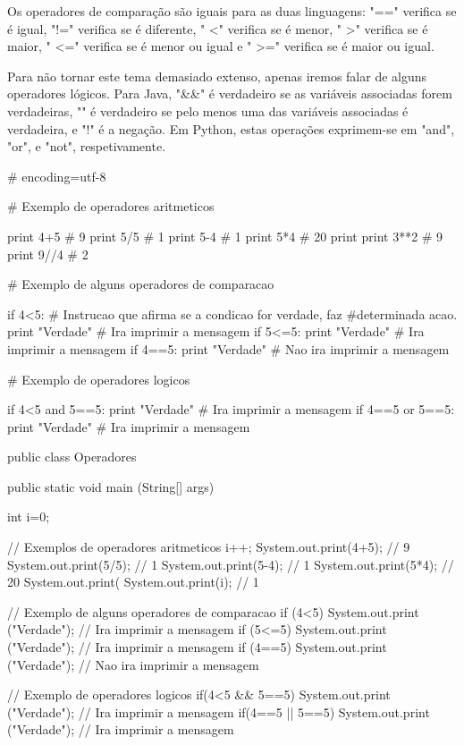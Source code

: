 \documentclass[11pt,openright,twoside]{report}
\begin{document}
Os operadores de comparação são iguais para as duas linguagens: "==" verifica se é igual, "!=" verifica se é diferente, " \textless " verifica se é menor, " \textgreater " verifica se é maior, " \textless =" verifica se é menor ou igual e " \textgreater =" verifica se é maior ou igual.
\smallskip

Para não tornar este tema demasiado extenso, apenas iremos falar de alguns operadores lógicos. Para Java, "\&\&" é verdadeiro se as variáveis associadas forem verdadeiras, "\textbar \textbar" é verdadeiro se pelo menos uma das variáveis associadas é verdadeira, e "!" é a negação. Em Python, estas operações exprimem-se em "and", "or", e "not", respetivamente.

\smallskip
\begin{Python}
# encoding=utf-8

# Exemplo de operadores aritmeticos

print 4+5		# 9
print 5/5		# 1
print 5-4 		# 1
print 5*4		# 20
print %
print 3**2		# 9
print 9//4		# 2

# Exemplo de alguns operadores de comparacao

if 4<5:		# Instrucao que afirma se a condicao for verdade, faz #determinada acao.
	print "Verdade"	# Ira imprimir a mensagem
if 5<=5:
	print "Verdade"	# Ira imprimir a mensagem
if 4==5:
	print "Verdade"	# Nao ira imprimir a mensagem
	
# Exemplo de operadores logicos

if 4<5 and 5==5:
	print "Verdade"	# Ira imprimir a mensagem
if 4==5 or 5==5:
	print "Verdade" # Ira imprimir a mensagem

\end{Python}
\smallskip

\smallskip
\begin{Java}
public class Operadores{

	public static void main (String[] args){
		
		int i=0;		
		
		// Exemplos de operadores aritmeticos
		i++;
		System.out.print(4+5); // 9
		System.out.print(5/5); // 1
		System.out.print(5-4); // 1
		System.out.print(5*4); // 20
		System.out.print(%
		System.out.print(i);   // 1
		
		// Exemplo de alguns operadores de comparacao
		if (4<5){
			System.out.print ("Verdade");	// Ira imprimir a mensagem
		}
		if (5<=5){
			System.out.print ("Verdade");	// Ira imprimir a mensagem
		}
		if (4==5){
			System.out.print ("Verdade");	// Nao ira imprimir a mensagem
		}

	
		// Exemplo de operadores logicos
		if(4<5 && 5==5){
			System.out.print ("Verdade"); // Ira imprimir a mensagem
		}		
		if(4==5 || 5==5){
			System.out.print ("Verdade"); // Ira imprimir a mensagem
		}
		
	}
}
\end{Java}
\medskip
\end{document}
